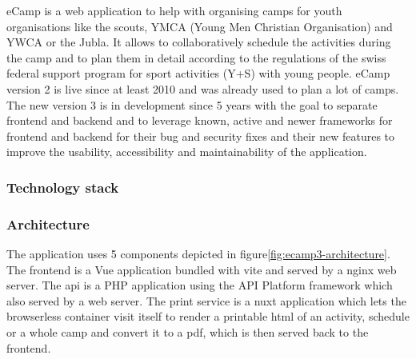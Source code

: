 \documentclass[conference]{IEEEtran}
\begin{document}
eCamp is a web application to help with organising camps for youth organisations like the
scouts, YMCA (Young Men Christian Organisation)\cite{ymca-website} and YWCA or the Jubla.
It allows to collaboratively schedule the activities during the camp and to plan them in detail
according to the regulations of the swiss federal support program for sport activities (Y+S) with young people\cite{J+S-Website,ecamp3-website}.
eCamp version 2 is live since at least 2010\cite{ecamp2-first-commit} and was already used to plan a lot of camps.
The new version 3 is in development since 5 years\cite{ecamp3-website} with the goal to separate frontend and backend and
to leverage known, active and newer frameworks for frontend and backend for their bug and security fixes and
their new features to improve the usability, accessibility and maintainability of the application.

\subsubsection{Technology stack}

\subsubsection{Architecture}

The application uses 5 components depicted in figure\ref{fig:ecamp3-architecture}.
The frontend is a Vue application bundled with vite and served by a nginx web server.
The api is a PHP application using the API Platform framework which also served by a web server.
The print service is a nuxt application which lets the browserless container visit itself to render a printable
html of an activity, schedule or a whole camp and convert it to a pdf, which is then served back to the frontend.
\end{document}

